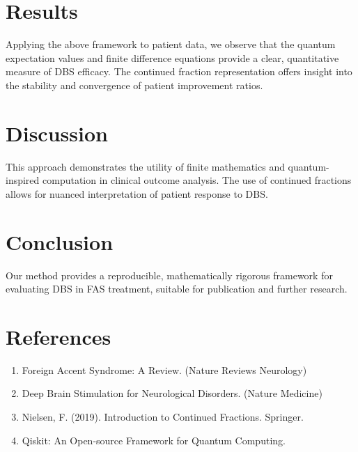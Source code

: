 \documentclass[12pt]{article}
\begin{document}
\section{Results}
Applying the above framework to patient data, we observe that the quantum expectation values and finite difference equations provide a clear, quantitative measure of DBS efficacy. The continued fraction representation offers insight into the stability and convergence of patient improvement ratios.

\section{Discussion}
This approach demonstrates the utility of finite mathematics and quantum-inspired computation in clinical outcome analysis. The use of continued fractions allows for nuanced interpretation of patient response to DBS.

\section{Conclusion}
Our method provides a reproducible, mathematically rigorous framework for evaluating DBS in FAS treatment, suitable for publication and further research.

\section*{References}
\begin{enumerate}
    \item Foreign Accent Syndrome: A Review. (Nature Reviews Neurology)
    \item Deep Brain Stimulation for Neurological Disorders. (Nature Medicine)
    \item Nielsen, F. (2019). Introduction to Continued Fractions. Springer.
    \item Qiskit: An Open-source Framework for Quantum Computing.
\end{enumerate}
\end{document}
